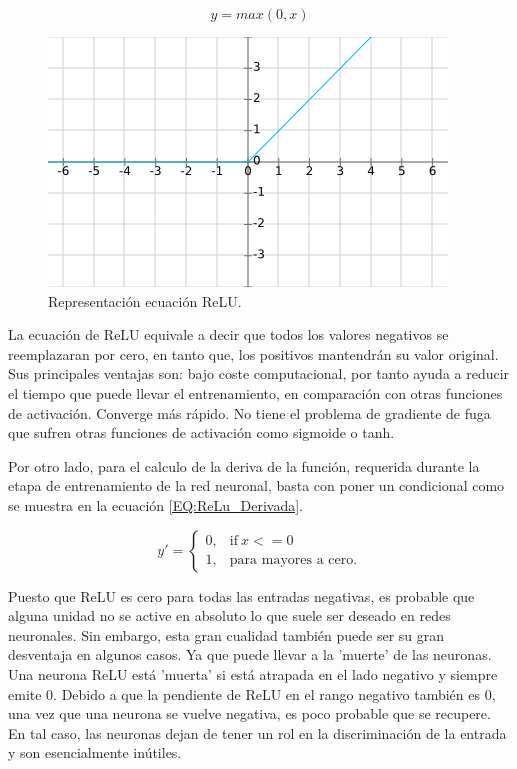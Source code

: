             \begin{equation}
                \label{EQ:ReLu}
                y = max(0, x)
            \end{equation}
            
            \begin{figure}[ht!]
            	\centering
            	\includegraphics[width=0.6\linewidth]{imgs/02-Referential/02-ReLU.png}
            	\caption[Representación ecuación ReLU]{Representación ecuación ReLU.}
        	    \label{fig:ReLU}
            \end{figure}%
            
            La ecuación de ReLU equivale a decir que todos los valores negativos se reemplazaran por cero, en tanto que, los positivos mantendrán su valor original. Sus principales ventajas son: bajo coste computacional, por tanto ayuda a reducir el tiempo que puede llevar el entrenamiento, en comparación con otras funciones de activación. Converge más rápido. No tiene el problema de gradiente de fuga que sufren otras funciones de activación como sigmoide o tanh. 
            
            Por otro lado, para el calculo de la deriva de la función, requerida durante la etapa de entrenamiento de la red neuronal, basta con poner un condicional como se muestra en la ecuación \ref{EQ:ReLu_Derivada}.
            
            \begin{equation}
                \label{EQ:ReLu_Derivada}
                y' = 
                \begin{cases}
                  0, & \text{if}\ x< = 0 \\
                  1, & \text{para mayores a cero.}
                \end{cases}
            \end{equation}
            
            Puesto que ReLU es cero para todas las entradas negativas, es probable que alguna unidad no se active en absoluto lo que suele ser deseado en redes neuronales. Sin embargo, esta gran cualidad también puede ser su gran desventaja en algunos casos. Ya que puede llevar a la 'muerte' de las neuronas. Una neurona ReLU está 'muerta' si está atrapada en el lado negativo y siempre emite 0. Debido a que la pendiente de ReLU en el rango negativo también es 0, una vez que una neurona se vuelve negativa, es poco probable que se recupere. En tal caso, las neuronas dejan de tener un rol en la discriminación de la entrada y son esencialmente inútiles.

